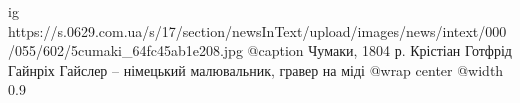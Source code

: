  
 
 
 
 

\ifcmt
  ig https://s.0629.com.ua/s/17/section/newsInText/upload/images/news/intext/000/055/602/5cumaki_64fc45ab1e208.jpg
	@caption Чумаки, 1804 р. Крістіан Готфрід Гайнріх Гайслер – німецький малювальник, гравер на міді
  @wrap center
  @width 0.9
\fi

